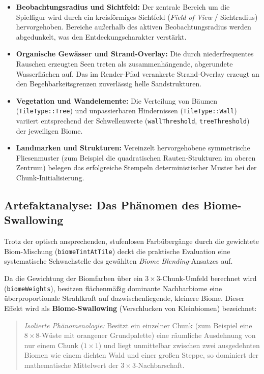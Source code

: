 \documentclass[
  a4paper,
  11pt,
  twoside,
  BCOR=8mm,           %
  headings=big,
  numbers=noenddot,
  listof=totoc,       %
  captions=tableheading,
]{scrreprt}
\begin{document}
\begin{itemize}
    \item \textbf{Beobachtungsradius und Sichtfeld:} Der zentrale Bereich um die Spielfigur wird durch ein kreisförmiges Sichtfeld (\textit{Field of View} / Sichtradius) hervorgehoben. Bereiche außerhalb des aktiven Beobachtungsradius werden abgedunkelt, was den Entdeckungscharakter verstärkt.
    \item \textbf{Organische Gewässer und Strand-Overlay:} Die durch niederfrequentes Rauschen erzeugten Seen treten als zusammenhängende, abgerundete Wasserflächen auf. Das im Render-Pfad verankerte Strand-Overlay erzeugt an den Begehbarkeitsgrenzen zuverlässig helle Sandstrukturen.
    \item \textbf{Vegetation und Wandelemente:} Die Verteilung von Bäumen (\texttt{TileType::Tree}) und unpassierbaren Hindernissen (\texttt{TileType::Wall}) variiert entsprechend der Schwellenwerte (\texttt{wallThreshold}, \texttt{treeThreshold}) der jeweiligen Biome.
    \item \textbf{Landmarken und Strukturen:} Vereinzelt hervorgehobene symmetrische Fliesenmuster (zum Beispiel die quadratischen Rauten-Strukturen im oberen Zentrum) belegen das erfolgreiche Stempeln deterministischer Muster bei der Chunk-Initialisierung.
\end{itemize}

\subsection{Artefaktanalyse: Das Phänomen des Biome-Swallowing}
\label{sec:ergebnisse_swallowing}
Trotz der optisch ansprechenden, stufenlosen Farbübergänge durch die gewichtete Biom-Mischung (\texttt{biomeTintAtTile}) deckt die praktische Evaluation eine systematische Schwachstelle des gewählten \textit{Biome Blending}-Ansatzes auf.

Da die Gewichtung der Biomfarben über ein $3 \times 3$-Chunk-Umfeld berechnet wird (\texttt{biomeWeights}), besitzen flächenmäßig dominante Nachbarbiome eine überproportionale Strahlkraft auf dazwischenliegende, kleinere Biome. Dieser Effekt wird als \textbf{Biome-Swallowing} (Verschlucken von Kleinbiomen) bezeichnet:

\begin{quote}
\textit{Isolierte Phänomenologie:} Besitzt ein einzelner Chunk (zum Beispiel eine $8 \times 8$-Wüste mit orangener Grundpalette) eine räumliche Ausdehnung von nur einem Chunk ($1 \times 1$) und liegt unmittelbar zwischen zwei ausgedehnten Biomen wie einem dichten Wald und einer großen Steppe, so dominiert der mathematische Mittelwert der $3 \times 3$-Nachbarschaft. 
\end{quote}
\end{document}
